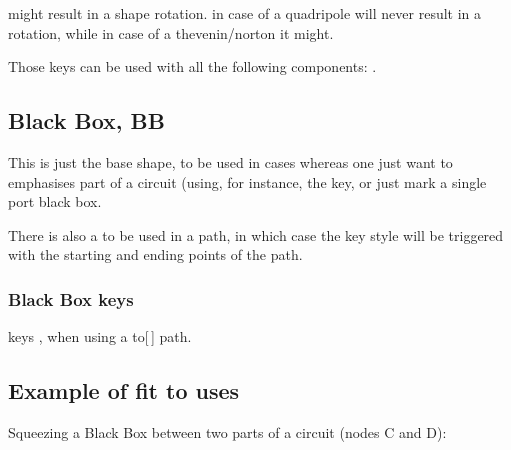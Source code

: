 \documentclass[a4paper, titlepage]{article}
\begin{document}
\begin{tsremark}
 might result in a shape rotation.  in case of a quadripole will never result in a rotation, while in case of a thevenin/norton it might.
\end{tsremark}
\begin{tsremark}
Those keys can be used with all the following components: .
\end{tsremark}


        
\subsection{Black Box, BB}
This is just the base shape, to be used in cases whereas one just want to emphasises part of a circuit (using, for instance, the  key, or just mark a single port black box.
\begin{tsremark}
There is also a  to be used in a  path, in which case the key  style will be triggered with the starting and ending points of the  path.
\end{tsremark}


\subsubsection{Black Box keys}
\begin{describelist*}[30mm]{keys}
    {, when using a to[\,] path.}
\end{describelist*}

\subsection{Example of fit to uses}
Squeezing a Black Box between two parts of a circuit (nodes C and D):
\end{document}
